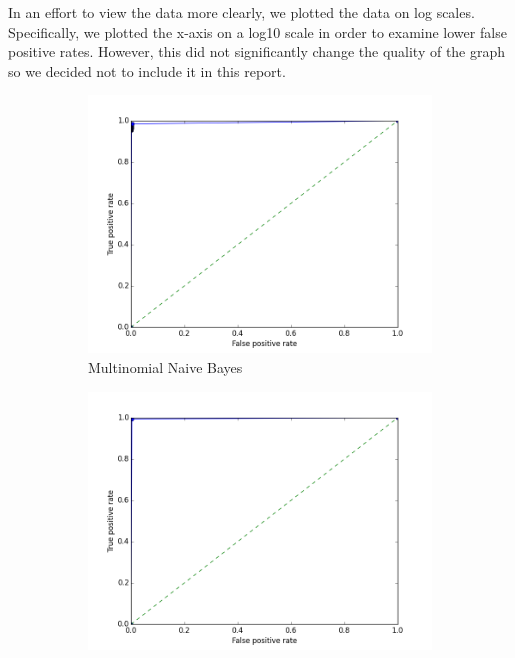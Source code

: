 \documentclass{article} %
\begin{document}
In an effort to view the data more clearly, we plotted the data on log scales. Specifically, we plotted the x-axis on a log10 scale in order to examine lower false positive rates. However, this did not significantly change the quality of the graph so we decided not to include it in this report. 

\begin{figure}[h]
  \centering
  \begin{subfigure}{0.45\textwidth}
    \includegraphics[width=\textwidth]{naive_bayes_roc_curve.png}
    \caption{Multinomial Naive Bayes}
  \end{subfigure}
  \begin{subfigure}{0.45\textwidth}
    \includegraphics[width=\textwidth]{decision_tree_roc_curve.png}

\end{subfigure}
\end{figure}
\end{document}
